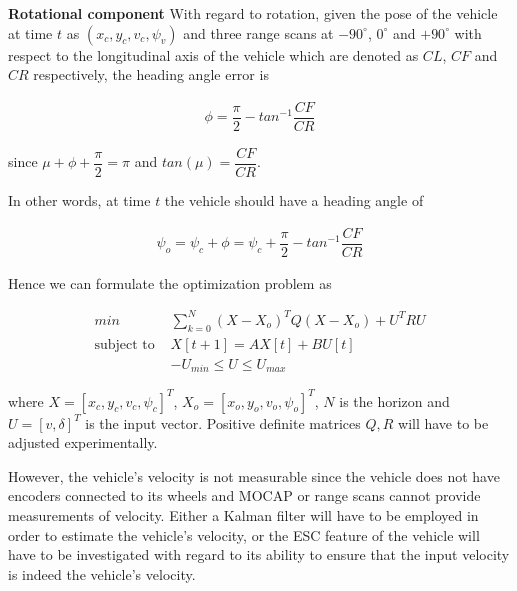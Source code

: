 \documentclass[oneside,12pt]{article}
\begin{document}
\begin{itemize}
    \begin{figure}[H]\centering
      \scalebox{1}{}
      \caption{}
      \label{}
    \end{figure}

    \begin{figure}[H]\centering
      \scalebox{1}{}
      \caption{}
      \label{}
    \end{figure}

    \textbf{Rotational component} With regard to rotation, given the pose of
    the vehicle at time $t$ as $(x_c, y_c, v_c, \psi_v)$ and three range scans
    at $-90^\circ$, $0^\circ$ and $+90^\circ$ with respect to the longitudinal
    axis of the vehicle which are denoted as $CL$, $CF$ and $CR$ respectively,
    the heading angle error is

    \begin{align}
      \phi = \dfrac{\pi}{2} - tan^{-1}\dfrac{CF}{CR}
    \end{align}

    since $\mu + \phi + \dfrac{\pi}{2} = \pi$ and $tan(\mu) = \dfrac{CF}{CR}$.

    In other words, at time $t$ the vehicle should have a heading angle of

    \begin{align}
      \psi_o = \psi_c + \phi = \psi_c + \dfrac{\pi}{2} - tan^{-1}\dfrac{CF}{CR}
    \end{align}


    \begin{figure}[H]\centering
      \scalebox{1}{}
      \caption{}
      \label{}
    \end{figure}

    Hence we can formulate the optimization problem as

    \begin{align}
      min &\sum\limits_{k=0}^N (X-X_o)^T Q (X-X_o) + U^T R U \\
      \text{subject to } & X[t+1] = A X[t] + B U[t] \\
      & -U_{min} \leq U \leq U_{max}
    \end{align}

    where $X=[x_c, y_c, v_c, \psi_c]^T$, $X_o = [x_o, y_o, v_o, \psi_o]^T$,
    $N$ is the horizon and $U=[v, \delta]^T$ is the input vector.
    Positive definite matrices $Q,R$ will have to be adjusted experimentally.

    However, the vehicle's velocity is not measurable since the vehicle does not
    have encoders connected to its wheels and MOCAP or range scans cannot
    provide measurements of velocity. Either a Kalman filter will have to be
    employed in order to estimate the vehicle's velocity, or the ESC feature of
    the vehicle will have to be investigated with regard to its ability to
    ensure that the input velocity is indeed the vehicle's velocity.
\end{itemize}
\end{document}
